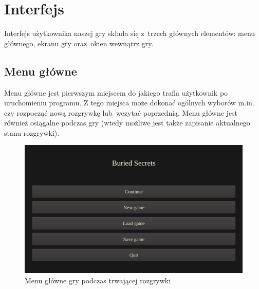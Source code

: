 \documentclass[licencjacka]{pracamgr}
\begin{document}
  \section{Interfejs}
    Interfejs użytkownika naszej gry składa się z~trzech głównych elementów: menu głównego, ekranu gry oraz~okien
    wewnątrz gry.

    \subsection{Menu główne}
      Menu główne jest pierwszym miejscem do jakiego trafia użytkownik po uruchomieniu programu. Z tego miejsca może
      dokonać ogólnych wyborów m.in. czy rozpocząć nową rozgrywkę lub~wczytać poprzednią. Menu główne jest również
      osiągalne podczas gry (wtedy możliwe jest także zapisanie aktualnego stanu rozgrywki).

      \begin{figure}[h]
        \centering
        \includegraphics[scale=0.3]{MenuGlowne.png}
        \caption{Menu główne gry podczas trwającej rozgrywki}
      \end{figure}
\end{document}
